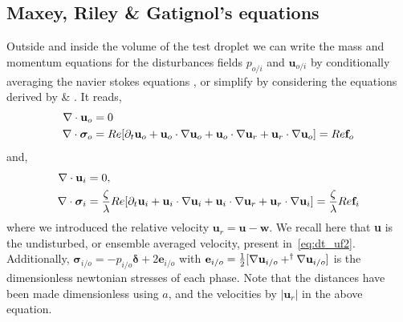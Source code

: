 \subsection{Maxey, Riley \& Gatignol's equations}

Outside and inside the volume of the test droplet we can write the mass and momentum equations for the disturbances fields $p_{o/i}$ and $\textbf{u}_{o/i}$ by conditionally averaging the navier stokes equations \citet{fintzi2025}, or simplify by considering the equations derived by \cite{maxey1983equation} \& \citet{gatignol1983faxen}. 
It reads, 
\begin{align}
    \div \textbf{u}_{o} &= 0
    \\
    \div\bm\sigma_{o}
    &= 
    Re [
    \pddt \textbf{u}_{o}
    + \textbf{u}_{o}\cdot \grad \textbf{u}_{o}
    + \textbf{u}_{o}\cdot \grad \textbf{u}_r
    + \textbf{u}_r \cdot \grad \textbf{u}_{o}]
    = Re \textbf{f}_{o}
    \label{eq:momentum_out}
\end{align}
and, 
\begin{align}
    \div \textbf{u}_{i} &= 0,
    \\
    \div\bm\sigma_{i}
    &= 
    \frac{\zeta}{\lambda}Re [
    \pddt \textbf{u}_{i}
    + \textbf{u}_{i}\cdot \grad \textbf{u}_{i}
    + \textbf{u}_{i}\cdot \grad \textbf{u}_r 
    + \textbf{u}_r \cdot \grad \textbf{u}_{i}]
    = \frac{\zeta}{\lambda}Re \textbf{f}_{i}
    \label{eq:momentum_in}
\end{align}
where we introduced the relative velocity $\textbf{u}_r = \textbf{u} - \textbf{w}$.  
We recall here that \textbf{u} is the undisturbed, or ensemble averaged velocity, present in~\ref{eq:dt_uf2}.
Additionally, $\bm\sigma_{i/o} = -p_{i/o}\bm\delta + 2\textbf{e}_{i/o}$ with $\textbf{e}_{i/o} = \frac{1}{2}[\mathbf{\nabla} \textbf{u}_{i/o} + ^{\dagger}\mathbf{\nabla} \textbf{u}_{i/o}]$ is the dimensionless newtonian stresses of each phase. 
Note that the distances have been made dimensionless using $a$, and the velocities by $|\textbf{u}_r|$ in the above equation. 

